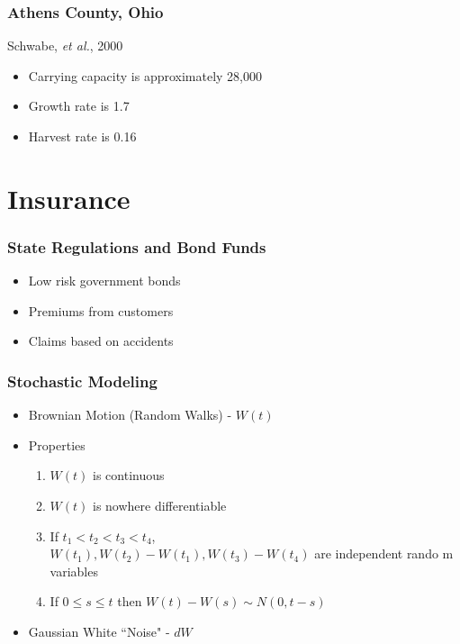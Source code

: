 \documentclass{beamer}   %
\begin{document}
\begin{frame}
  \frametitle{Athens County, Ohio}
  Schwabe, \emph{et al.}, 2000
  \begin{itemize}
  \item Carrying capacity is approximately 28,000
  \item Growth rate is 1.7
  \item Harvest rate is 0.16
  \end{itemize}
\end{frame}


\section{Insurance}

\begin{frame}
  \frametitle{State Regulations and Bond Funds}
  \begin{itemize}
  \item Low risk government bonds
  \item Premiums from customers
  \item Claims based on accidents
  \end{itemize}
\end{frame}


\begin{frame}
  \frametitle{Stochastic Modeling}
  \begin{itemize}
  \item Brownian Motion (Random Walks) - $W(t)$
  \item Properties
    \begin{enumerate}[i]
    \item $W(t)$ is continuous
    \item $W(t)$ is nowhere differentiable
    \item If $t_{1}<t_{2}<t_{3}<t_{4}$, \\
      $W(t_{1}), W(t_{2})-W(t_{1}),  W(t_{3})-W(t_{4})$ are independent rando
      m variables
    \item If $0 \le s\le t$ then $W(t)-W(s) \sim N(0, t-s)$
    \end{enumerate}
  \item Gaussian White ``Noise" - $dW$
  \end{itemize}
\end{frame}
\end{document}
